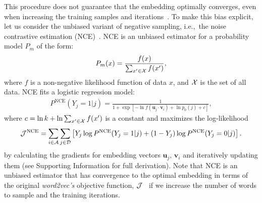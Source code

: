\documentclass[12pt]{article} %
\newcommand{\vect}[1]{\boldsymbol{#1}}
\def\ie{i.e.,~}
\begin{document}
This procedure does not guarantee that the embedding optimally converges, even when increasing the training samples and iterations~\autocite{Chia2010,Dyer2014}. To make this bias explicit, let us consider the unbiased variant of negative sampling, \ie the noise contrastive estimation (NCE)~\autocite{Chia2010,Dyer2014}.
NCE is an unbiased estimator for a probability model $P_m$ of the form:
\begin{align}
	\label{eq:nce-model}
	P_m(x) = \frac{ f(x) }{\sum_{ x' \in {\cal X}} f(x') },
\end{align}
where $f$ is a non-negative likelihood function of data $x$, and ${\cal X}$ is the set of all data. NCE fits a logistic regression model:
\begin{align}
	\label{eq:nce}
	P^{\text{NCE}}\left(Y_{j}=1 \vert j\right) = \frac{
		1
	}{
		1 + \exp\left[ - \ln f(\vect{u}_j \cdot \vect{v}_{i})  + \ln p_0(j) + c \right]
	},
\end{align}
where $c = \ln k + \ln\sum_{ x' \in {\cal X}} f(x') $ is a constant and maximizes the log-likelihood
\begin{align}
	\label{eq:log-likelihood-logistic-regress}
	{\cal J}^{\text{NCE}} = \sum_{i \in {\cal A}}\sum_{j \in {\cal D}} \left[ Y_{j} \log P^{\text{NCE}}(Y_{j} = 1\vert j) + (1-Y_{j}) \log P^{\text{NCE}}(Y_{j} = 0 \vert j)\right].
\end{align}
by calculating the gradients for embedding vectors $\vect{u}_j$, $\vect{v}_{i}$ and iteratively updating them (see Supporting Information for full derivation). Note that NCE is an unbiased estimator that has convergence to the optimal embedding in terms of the original \textit{word2vec's} objective function, ${\cal J}$~\autocite{Chia2010,Dyer2014} if we increase the number of words to sample and the training iterations.
\end{document}
